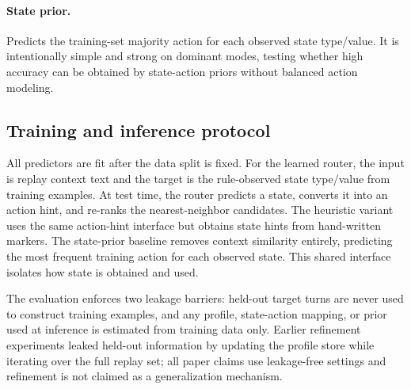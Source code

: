 \paragraph{State prior.} Predicts the training-set majority action for each observed state type/value. It is intentionally simple and strong on dominant modes, testing whether high accuracy can be obtained by state-action priors without balanced action modeling.

\subsection{Training and inference protocol}

All predictors are fit after the data split is fixed. For the learned router, the input is replay context text and the target is the rule-observed state type/value from training examples. At test time, the router predicts a state, converts it into an action hint, and re-ranks the nearest-neighbor candidates. The heuristic variant uses the same action-hint interface but obtains state hints from hand-written markers. The state-prior baseline removes context similarity entirely, predicting the most frequent training action for each observed state. This shared interface isolates how state is obtained and used.

The evaluation enforces two leakage barriers: held-out target turns are never used to construct training examples, and any profile, state-action mapping, or prior used at inference is estimated from training data only. Earlier refinement experiments leaked held-out information by updating the profile store while iterating over the full replay set; all paper claims use leakage-free settings and refinement is not claimed as a generalization mechanism.
